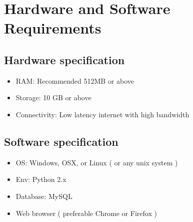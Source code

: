 \section{Hardware and Software Requirements}

\subsection{Hardware specification}
\vspace{1em}
\begin{itemize}
\item RAM: Recommended 512MB or above
\item Storage: 10 GB or above
\item Connectivity: Low latency internet with high bandwidth
\end{itemize}
\subsection{Software specification}
\begin{itemize}
\item OS: Windows, OSX, or Linux ( or any unix system )
\item Env: Python 2.x
\item Database: MySQL
\item Web browser ( preferable Chrome or Firefox )
\end{itemize}
